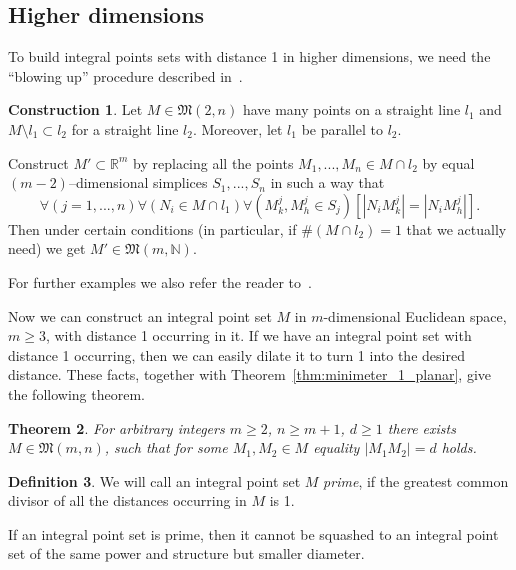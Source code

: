 \documentclass[a4paper,14pt]{article} %
\theoremstyle{plain}
\newtheorem{theorem}{Theorem}[section]
\theoremstyle{definition}
\newtheorem{definition}[theorem]{Definition}
\newtheorem{construction}[theorem]{Construction}
\begin{document}
\subsection{Higher dimensions}

To build integral points sets with distance 1 in higher dimensions,
we need the ``blowing up'' procedure described in~\cite[Theorem 1.3]{kurz2008bounds}.

\begin{construction}
	\label{con:blowing_up}
	Let $M\in\mathfrak{M}(2,n)$ have many points on a straight line $l_1$
	and $M\setminus l_1 \subset l_2$ for a straight line $l_2$.
	Moreover, let $l_1$ be parallel to $l_2$.

	Construct $M' \subset \mathbb{R}^m$ by replacing all the points $M_1,...,M_n\in M \cap l_2$
	by equal $(m-2)$--dimensional simplices $S_1,...,S_n$
	in such a way that
	\begin{equation}
		\forall(j=1,...,n) \forall(N_i \in M \cap l_1 )\forall\left(M^j_k, M^j_h \in S_j\right)\left[|N_i M^j_k| = |N_i M^j_h|\right].
	\end{equation}
	Then under certain conditions (in particular, if $\#(M \cap l_2)=1$ that we actually need)
	we get $M'\in\mathfrak{M}(m,\mathbb{N})$.

	For further examples we also refer the reader to~\cite{avdeev2019particular}.
\end{construction}

Now we can construct an integral point set $M$ in $m$-dimensional Euclidean space, $m\geq 3$,
with distance 1 occurring in it.
If we have an integral point set with distance 1 occurring,
then we can easily dilate it to turn 1 into the desired distance.
These facts, together with Theorem~\ref{thm:minimeter_1_planar}, give the following theorem.

\begin{theorem}
	For arbitrary integers $m \geq 2$, $n \geq m+1$, $d \geq 1$
	there exists $M\in\mathfrak{M}(m,n)$,
	such that for some $M_1, M_2\in M$ equality $|M_1 M_2| = d$ holds.
\end{theorem}


\begin{definition}
	\cite{noll1989nclusters}
	We will call an integral point set $M$ \textit{prime}, if the greatest common divisor
	of all the distances occurring in $M$ is 1.
\end{definition}

If an integral point set is prime,
then it cannot be squashed to an integral point set of the same power and structure but smaller diameter.
\end{document}
